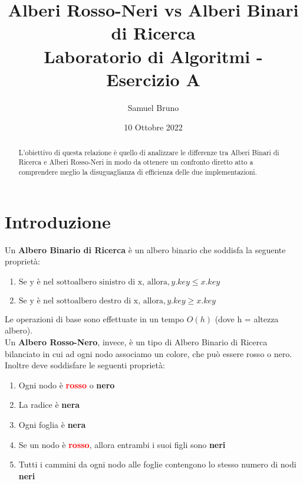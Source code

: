 \documentclass{article}
\title{Alberi Rosso-Neri vs Alberi Binari di Ricerca \\
       \large Laboratorio di Algoritmi - Esercizio A}
\author{Samuel Bruno}
\date{10 Ottobre 2022}
\begin{document}
\maketitle

\begin{abstract}
L'obiettivo di questa relazione è quello di analizzare le differenze tra Alberi Binari di Ricerca e Alberi Rosso-Neri in modo da ottenere un confronto diretto atto a comprendere meglio la disuguaglianza di efficienza delle due implementazioni.
\end{abstract}

\section{Introduzione}
Un \textbf{Albero Binario di Ricerca} è un albero binario che soddisfa la seguente proprietà:
\begin{enumerate}[label={\roman*.)}, ref={\roman*.)}]
    \item $ \text{Se y è nel sottoalbero sinistro di x, allora}, y.key \leq x.key \label{unoABR}$
    \item $ \text{Se y è nel sottoalbero destro di x, allora}, y.key \geq x.key \label{dueABR}$
\end{enumerate}
Le operazioni di base sono effettuate in un tempo $O(h)$ (dove h = altezza albero).\\

Un \textbf{Albero Rosso-Nero}, invece, è un tipo di Albero Binario di Ricerca bilanciato  in cui ad ogni nodo associamo un colore, che può essere rosso o nero. Inoltre deve soddisfare le seguenti proprietà:
\begin{enumerate}[label={\roman*.)}, ref={\roman*.)}]
    \item Ogni nodo è \textbf{\textcolor{red}{rosso}} o \textbf{nero}
    \item La radice è \textbf{nera}
    \item Ogni foglia è \textbf{nera}
    \item Se un nodo è \textbf{\textcolor{red}{rosso}}, allora entrambi i suoi figli sono \textbf{neri}
    \item Tutti i cammini da ogni nodo alle foglie contengono lo stesso
    numero di nodi \textbf{neri}
\end{enumerate}
\end{document}
